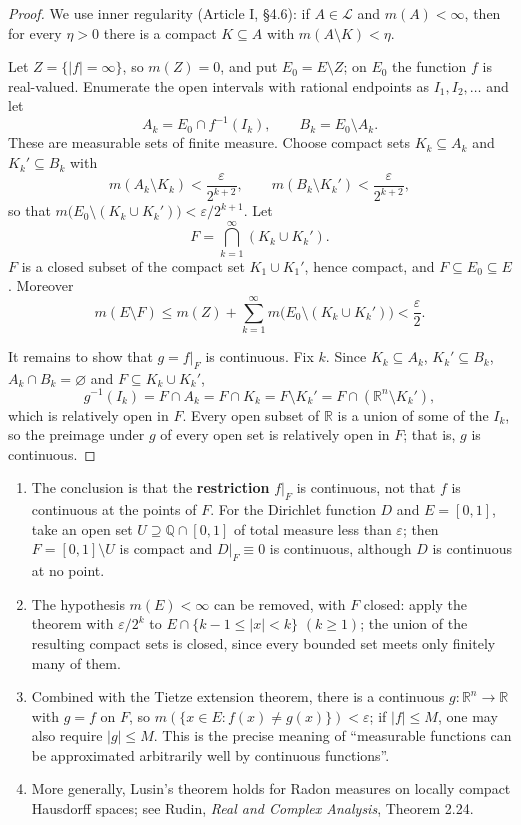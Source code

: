 \documentclass[11pt]{article}
\makeatletter
\newcommand{\envlabel}[1]{\protected@edef\@currentlabel{\themathenv}\label{#1}}
\makeatother
\begin{document}
\begin{proof}
We use inner regularity (Article I, \S4.6): if $A\in\mathcal{L}$ and $m(A)<\infty$, then for every $\eta>0$ there is a compact $K\subseteq A$ with $m(A\setminus K)<\eta$.

Let $Z=\{|f|=\infty\}$, so $m(Z)=0$, and put $E_{0}=E\setminus Z$; on $E_{0}$ the function $f$ is real-valued. Enumerate the open intervals with rational endpoints as $I_{1},I_{2},\ldots$ and let
\[
A_{k}=E_{0}\cap f^{-1}(I_{k}),\qquad B_{k}=E_{0}\setminus A_{k}.
\]
These are measurable sets of finite measure. Choose compact sets $K_{k}\subseteq A_{k}$ and $K_{k}'\subseteq B_{k}$ with
\[
m(A_{k}\setminus K_{k})<\frac{\varepsilon}{2^{k+2}},\qquad m(B_{k}\setminus K_{k}')<\frac{\varepsilon}{2^{k+2}},
\]
so that $m\big(E_{0}\setminus(K_{k}\cup K_{k}')\big)<\varepsilon/2^{k+1}$. Let
\[
F=\bigcap_{k=1}^{\infty}(K_{k}\cup K_{k}').
\]
$F$ is a closed subset of the compact set $K_{1}\cup K_{1}'$, hence compact, and $F\subseteq E_{0}\subseteq E$. Moreover
\[
m(E\setminus F)\leq m(Z)+\sum_{k=1}^{\infty}m\big(E_{0}\setminus(K_{k}\cup K_{k}')\big)<\frac{\varepsilon}{2}.
\]

It remains to show that $g=f|_{F}$ is continuous. Fix $k$. Since $K_{k}\subseteq A_{k}$, $K_{k}'\subseteq B_{k}$, $A_{k}\cap B_{k}=\varnothing$ and $F\subseteq K_{k}\cup K_{k}'$,
\[
g^{-1}(I_{k})=F\cap A_{k}=F\cap K_{k}=F\setminus K_{k}'=F\cap(\mathbb{R}^{n}\setminus K_{k}'),
\]
which is relatively open in $F$. Every open subset of $\mathbb{R}$ is a union of some of the $I_{k}$, so the preimage under $g$ of every open set is relatively open in $F$; that is, $g$ is continuous.
\end{proof}

\begin{remark}\envlabel{en:rem:lusin}
\leavevmode
\begin{enumerate}
  \item The conclusion is that the \textbf{restriction} $f|_{F}$ is continuous, not that $f$ is continuous at the points of $F$. For the Dirichlet function $D$ and $E=[0,1]$, take an open set $U\supseteq\mathbb{Q}\cap[0,1]$ of total measure less than $\varepsilon$; then $F=[0,1]\setminus U$ is compact and $D|_{F}\equiv0$ is continuous, although $D$ is continuous at no point.
  \item The hypothesis $m(E)<\infty$ can be removed, with $F$ closed: apply the theorem with $\varepsilon/2^{k}$ to $E\cap\{k-1\leq|x|<k\}$ $(k\geq1)$; the union of the resulting compact sets is closed, since every bounded set meets only finitely many of them.
  \item Combined with the Tietze extension theorem, there is a continuous $g:\mathbb{R}^{n}\to\mathbb{R}$ with $g=f$ on $F$, so $m(\{x\in E:f(x)\neq g(x)\})<\varepsilon$; if $|f|\leq M$, one may also require $|g|\leq M$. This is the precise meaning of ``measurable functions can be approximated arbitrarily well by continuous functions''.
  \item More generally, Lusin's theorem holds for Radon measures on locally compact Hausdorff spaces; see Rudin, \emph{Real and Complex Analysis}, Theorem 2.24.
\end{enumerate}
\end{remark}
\end{document}
